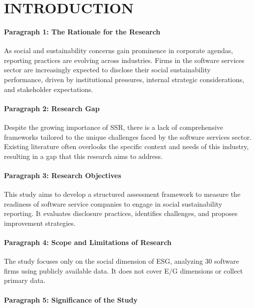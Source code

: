 \chapter{INTRODUCTION}

\subsubsection{Paragraph 1: The Rationale for the Research}

As social and sustainability concerns gain prominence in corporate agendas, 
reporting practices are evolving across industries. Firms in the software services sector are increasingly expected to 
disclose their social sustainability performance, 
driven by institutional pressures, internal strategic considerations, 
and stakeholder expectations.

\subsubsection{Paragraph 2: Research Gap}

Despite the growing importance of SSR, there is a lack of comprehensive frameworks 
tailored to the unique challenges faced by the software services sector. 
Existing literature often overlooks the specific context and needs of this 
industry, resulting in a gap that this research aims to address.

\subsubsection{Paragraph 3: Research Objectives}

This study aims to develop a structured assessment framework to measure 
the readiness of software service companies to engage 
in social sustainability reporting. It evaluates disclosure practices, 
identifies challenges, and proposes improvement strategies.

\subsubsection{Paragraph 4: Scope and Limitations of Research}
The study focuses only on the social dimension of ESG, analyzing 30 
software firms using publicly available data. 
It does not cover E/G dimensions or collect primary data.

\subsubsection{Paragraph 5: Significance of the Study}


